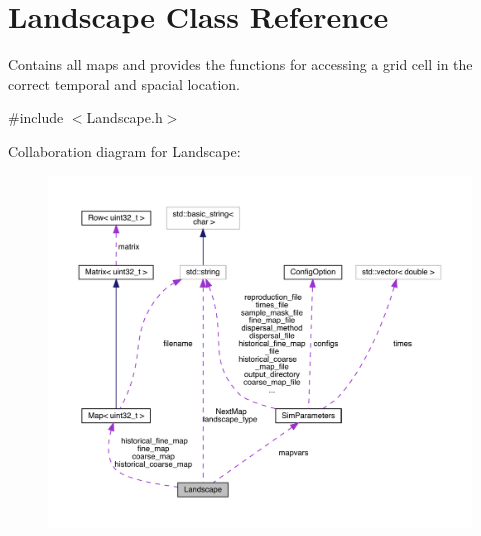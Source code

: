 \hypertarget{class_landscape}{}\section{Landscape Class Reference}
\label{class_landscape}


Contains all maps and provides the functions for accessing a grid cell in the correct temporal and spacial location.  




{\ttfamily \#include $<$Landscape.\+h$>$}



Collaboration diagram for Landscape\+:
\nopagebreak
\begin{figure}[H]
\begin{center}
\leavevmode
\includegraphics[width=350pt]{class_landscape__coll__graph}
\end{center}
\end{figure}
